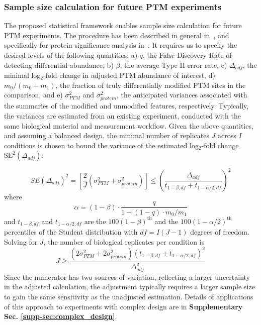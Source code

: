 \documentclass[mcp]{article}
\numberwithin{table}{section}
\begin{document}
\subsubsection*{Sample size calculation for future PTM experiments}
\label{sec:design}

The proposed statistical framework enables sample size calculation for future PTM experiments. 
The procedure has been described in general in~\cite{kutner_etal_04a}, and specifically for protein significance analysis in~\cite{oberg_vitek_09a}. 
It requires us to specify the desired levels of the following quantities: a) $q$, the False Discovery Rate of detecting differential abundance, b) $\beta$, the average Type II error rate, c) $\Delta_{adj}$, the minimal log$_2$-fold change in adjusted PTM abundance  of interest, d) $m_0 / (m_0 + m_1)$, the fraction of truly differentially modified PTM sites in the comparison, and e) $\sigma_{PTM}^{2}$ and $\sigma_{protein}^{2}$, the anticipated variances associated with the summaries of the modified and unmodified features, respectively. Typically, the variances are estimated from an existing experiment, conducted with the same biological material and measurement workflow. Given the above quantities, and assuming a balanced design, the minimal number of replicates $J$ across $I$ conditions is chosen to bound the variance of the estimated log$_2$-fold change $\mathrm{SE}^{2}(\Delta_{adj})$:

\begin{equation}
SE(\Delta_{adj})^2 = \left[ \frac{2}{J} \left( \sigma_{PTM}^{2} + \sigma_{protein}^{2} \right) \right]
\leq \left( \frac{\Delta_{adj}}{t_{1-\beta, df} + t_{1-\alpha /2, df}} \right)^{2}
\end{equation}
where 
\begin{equation}
\alpha = (1 - \beta) \cdot \frac{q}{1 + (1-q) \cdot m_0 / m_1}
\end{equation}
and $t_{1-\beta, df}$ and $t_{1-\alpha /2, df}$ are the $100(1-\beta)^{\text{th}}$ and the $100(1-\alpha /2)^{\text{th}}$ percentiles of the Student distribution with $df = I(J-1)$ degrees of freedom.  Solving for $J$, the number of biological replicates per condition is
\begin{equation}
J \geq \frac{(2\sigma_{PTM}^{2} + 2\sigma_{protein}^{2})(t_{1-\beta, df} + t_{1-\alpha /2, df})^2}{\Delta_{adj}^2}
\end{equation}
Since the numerator has two sources of variation, reflecting a larger uncertainty in the adjusted calculation, the adjustment typically requires a larger sample size to gain the same sensitivity as the unadjusted estimation. Details of applications of this approach to experiments with complex design are in {\bf Supplementary Sec. \ref{supp-sec:complex_design}}.
\end{document}
